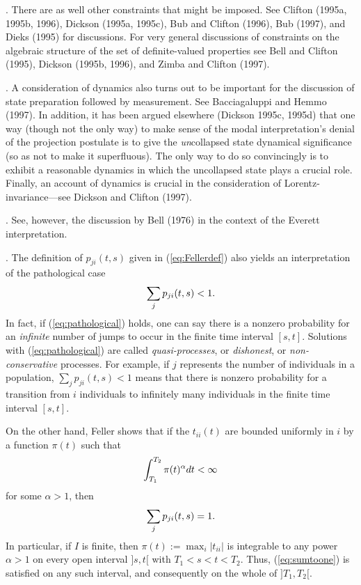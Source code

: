 \documentclass[12pt]{article}
\newcommand{\be}{\vspace*{6pt} \begin{equation}}
\newcommand{\ee}{\vspace*{10pt} \end{equation}}
\newcommand{\abs}[1]{\left|#1\right|}
\begin{document}
\vspace*{12pt}

. There are as well other constraints that might be imposed.
See Clifton (1995a, 1995b, 1996), Dickson (1995a, 1995c), Bub and 
Clifton (1996), Bub (1997), and Dieks (1995) for discussions.  For 
very general discussions of constraints on the algebraic structure of 
the set of definite-valued properties see Bell and Clifton (1995), 
Dickson (1995b, 1996), and Zimba and Clifton (1997).

\vspace*{12pt}

.  A consideration of dynamics also turns out to be
important for the discussion of state preparation followed by 
measurement.  See Bacciagaluppi and Hemmo (1997).  In addition, it has 
been argued elsewhere (Dickson 1995c, 1995d) that one way (though not 
the only way) to make sense of the modal interpretation's denial of 
the projection postulate is to give the {\it un}collapsed state 
dynamical significance (so as not to make it superfluous).  The only 
way to do so convincingly is to exhibit a reasonable dynamics in which 
the uncollapsed state plays a crucial role.  Finally, an account of 
dynamics is crucial in the consideration of Lorentz-invariance---see 
Dickson and Clifton (1997).

\vspace*{12pt}

. See, however, the discussion by Bell (1976) in the context
of the Everett interpretation.

\vspace*{12pt}

.  The definition of $p_{ji}(t,s)$ given in
(\ref{eq:Fellerdef}) also yields an interpretation of the pathological 
case
\be
  \label{eq:pathological}
  \sum_j p_{ji}(t,s)<1.
\ee
In fact, if (\ref{eq:pathological}) holds, one can say there is a 
nonzero probability for an {\em infinite} number of jumps to occur in 
the finite time interval $[s,t]$.  Solutions with 
(\ref{eq:pathological}) are called {\em quasi-processes}, or {\em 
dishonest}, or {\em non-conservative} processes.  For example, if $j$ 
represents the number of individuals in a population, $\sum_j 
p_{ji}(t,s)<1$ means that there is nonzero probability for a 
transition from $i$ individuals to infinitely many individuals in the 
finite time interval $[s,t]$.

On the other hand, Feller shows that if the $t_{ii}(t)$ are
bounded uniformly in $i$ by a function $\pi(t)$ such that
\be
  \int_{T_1}^{T_2}\pi(t)^{\alpha}dt<\infty
\ee
for some $\alpha>1$, then
\be
  \sum_j p_{ji}(t,s)=1.
  \label{eq:sumtoone}
\ee
In particular, if $I$ is finite, then ${\displaystyle 
\pi(t):=\max_i\abs{t_{ii}}}$ is integrable to any power $\alpha>1$ on 
every open interval $]s,t[$ with $T_1<s<t<T_2$.  Thus, 
(\ref{eq:sumtoone}) is satisfied on any such interval, and 
consequently on the whole of $]T_1,T_2[$.
\end{document}
